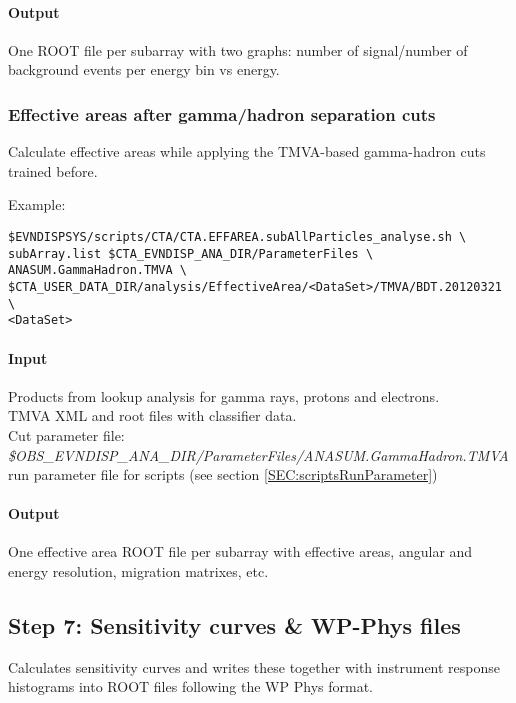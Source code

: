 \documentclass[titlepage,a4paper,twoside,11pt]{report}
\begin{document}
\paragraph{Output}

One ROOT file per subarray with two graphs: number of signal/number of background events per energy bin vs energy.

\subsubsection{Effective areas after gamma/hadron separation cuts}

Calculate effective areas while applying the TMVA-based gamma-hadron cuts
trained before.

Example:

\begin{lstlisting}
$EVNDISPSYS/scripts/CTA/CTA.EFFAREA.subAllParticles_analyse.sh \
subArray.list $CTA_EVNDISP_ANA_DIR/ParameterFiles \
ANASUM.GammaHadron.TMVA \
$CTA_USER_DATA_DIR/analysis/EffectiveArea/<DataSet>/TMVA/BDT.20120321 \
<DataSet> 
\end{lstlisting}

\paragraph{Input}
Products from lookup analysis for gamma rays, protons and electrons. \\
TMVA XML and root files with classifier data. \\
Cut parameter file: \\
{\it \$OBS\_EVNDISP\_ANA\_DIR/ParameterFiles/ANASUM.GammaHadron.TMVA}\\
run parameter file for scripts (see section \ref{SEC:scriptsRunParameter})

\paragraph{Output}
One effective area ROOT file per subarray with effective areas, angular and energy resolution, migration matrixes, etc.

\subsection{Step 7: Sensitivity curves \& WP-Phys files}

Calculates sensitivity curves and writes these together with instrument response histograms into ROOT files following the WP Phys format.
\end{document}
